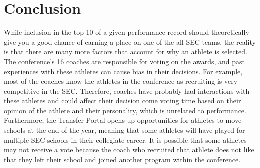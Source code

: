 \documentclass{article}
\begin{document}
\section{Conclusion}
While inclusion in the top 10 of a given performance record should theoretically give you a good chance of earning a place on one of the all-SEC teams, the reality is that there are many more factors that account for why an athlete is selected. The conference’s 16 coaches are responsible for voting on the awards, and past experiences with these athletes can cause bias in their decisions. For example, most of the coaches know the athletes in the conference as recruiting is very competitive in the SEC. Therefore, coaches have probably had interactions with these athletes and could affect their decision come voting time based on their opinion of the athlete and their personality, which is unrelated to performance. Furthermore, the Transfer Portal opens up opportunities for athletes to move schools at the end of the year, meaning that some athletes will have played for multiple SEC schools in their collegiate career. It is possible that some athletes may not receive a vote because the coach who recruited that athlete does not like that they left their school and joined another program within the conference.



\end{document}

